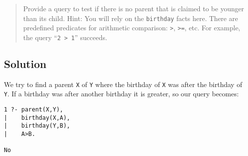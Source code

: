 \documentclass[11pt]{article}
\begin{document}
\begin{quote}
Provide a query to test if there is no parent that is claimed to be younger than its child. Hint: You will rely on the \verb|birthday| facts here. There are predefined predicates for arithmetic comparison: \verb|>|, \verb|>=|, etc. For example, the query ``\verb|2 > 1|'' succeeds.
\end{quote}

\subsection*{Solution}

We try to find a parent \verb|X| of \verb|Y| where the birthday of \verb|X| was after the birthday of \verb|Y|. If a birthday was after another birthday it is greater, so our query becomes:

\begin{verbatim}
1 ?- parent(X,Y),
|    birthday(X,A),
|    birthday(Y,B),
|    A>B.

No
\end{verbatim}
\end{document}
